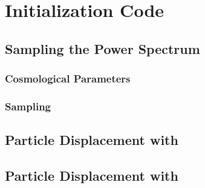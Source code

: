
%
%

\section{Initialization Code}
\label{sec:initialization}





\subsection{Sampling the Power Spectrum}
\label{subsec:initializtion--sampling}



\subsubsection{Cosmological Parameters}
\label{subsubsec:initialization--sampling--cosmological_parameters}



\subsubsection{Sampling}
\label{subsubsec:initialization--sampling--sampling}




\subsection{Particle Displacement with \za}
\label{subsec:initialization--za_displacement}




\subsection{Particle Displacement with \lpt}
\label{subsec:initialization--2lpt_displacement}




